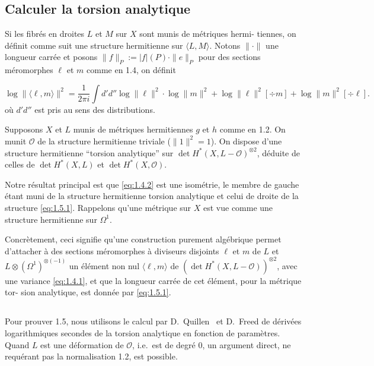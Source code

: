 \documentclass[12pt,a4paper]{article}
\theoremstyle{plain}
\theoremstyle{definition}
\newcommand{\Oo}{\mathscr{O}}
\begin{document}
\subsection{Calculer la torsion analytique}

Si les fibr\'es en droites $L$ et $M$ sur $X$ sont munis de m\'etriques hermi-
tiennes, on d\'efinit comme suit une structure hermitienne sur $\langle L, M \rangle$. Notons
$\|\cdot\|$ une longueur carr\'ee et posons $\|f\|_P := |f|(P) \cdot \|e\|_P$ pour des sections
m\'eromorphes $\ell$ et $m$ comme en 1.4, on d\'efinit

\begin{equation}\label{eq:1.5.1}
\log \|\langle \ell, m \rangle\|^2 = \frac{1}{2\pi i} \int d'd'' \log \|\ell\|^2 \cdot \log \|m\|^2 + \log \|\ell\|^2 [\div m] + \log \|m\|^2 [\div \ell] .
\end{equation}
o\`u $d'd''$ est pris au sens des distributions.

Supposons $X$ et $L$ munis de m\'etriques hermitiennes $g$ et $h$ comme en
1.2. On munit $\Oo$ de la structure hermitienne triviale ($\|1\|^2 = 1$). On dispose
d'une structure hermitienne ``torsion analytique'' sur $\det H^*(X, L - \Oo)^{\otimes 2}$, d\'eduite
de celles de $\det H^*(X,L)$ et $\det H^*(X,\Oo)$.

Notre r\'esultat principal est que \eqref{eq:1.4.2} est une isom\'etrie, le membre de
gauche \'etant muni de la structure hermitienne torsion analytique et celui de droite
de la structure \eqref{eq:1.5.1}. Rappelons qu'une m\'etrique sur $X$ est vue comme une
structure hermitienne sur $\Omega^1$.

Concr\`etement, ceci signifie qu'une construction purement alg\'ebrique permet
d'attacher \`a des sections m\'eromorphes \`a diviseurs disjoints $\ell$ et $m$ de $L$
et $L \otimes (\Omega^1)^{\otimes(-1)}$ un \'el\'ement non nul $\langle \ell, m \rangle$ de $(\det H^*(X, L - \Oo))^{\otimes 2}$, avec une
variance \eqref{eq:1.4.1}, et que la longueur carr\'ee de cet \'el\'ement, pour la m\'etrique tor-
sion analytique, est donn\'ee par \eqref{eq:1.5.1}.

\subsection{}

Pour prouver 1.5, nous utilisons le calcul par D.~Quillen~\cite{13} et D.~Freed
\cite{6} de d\'eriv\'ees logarithmiques secondes de la torsion analytique en fonction de
param\`etres. Quand $L$ est une d\'eformation de $\Oo$, i.e.\ est de degr\'e 0, un argument
direct, ne requ\'erant pas la normalisation 1.2, est possible.
\end{document}
